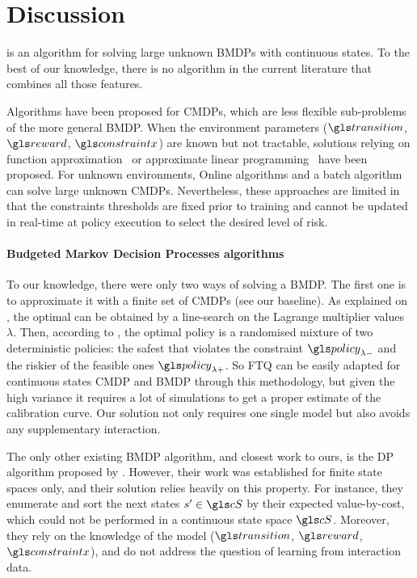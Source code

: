 \section*{Discussion}

 is an algorithm for solving large unknown \glspl{BMDP} with continuous states. To the best of our knowledge, there is no algorithm in the current literature that combines all those features.

Algorithms have been proposed for \glspl{CMDP}, which are less flexible sub-problems of the more general \gls{BMDP}. When the environment parameters ($\Ps$, $\R$, $\constraint$) are known but not tractable, solutions relying on function approximation~\citep{Undurti2011} or approximate linear programming~\citep{Poupart2015} have been proposed. For unknown environments, Online algorithms \citep{Geibel2005, Abe2010,Achiam2017,Chow2018} and a batch algorithm \citep{Thomas2015, Ghavamzadeh2016, Laroche2019,Le2019} can solve large unknown \glspl{CMDP}. Nevertheless, these approaches are limited in that the constraints thresholds are fixed prior to training and cannot be updated in real-time at policy execution to select the desired level of risk.

\paragraph{Budgeted Markov Decision Processes algorithms}
To our knowledge, there were only two ways of solving a \gls{BMDP}. The first one is to approximate it with a finite set of \glspl{CMDP} (\eg see our \FTQl baseline). As explained on , the optimal  can be obtained by a line-search on the Lagrange multiplier values $\lambda$. Then, according to \citet[Theorem 4.4]{Beutler1985}, the optimal policy is a randomised mixture of two deterministic policies: the safest  that violates the constraint $\policy_{\lambda-}$ and the riskier of the feasible ones $\policy_{\lambda+}$. So \gls{FTQ} can be easily adapted for continuous states \gls{CMDP} and \gls{BMDP} through this methodology, but given the high variance it requires a lot of simulations to get a proper estimate of the calibration curve. Our solution not only requires one single model but also avoids any supplementary interaction.

The only other existing \gls{BMDP} algorithm, and closest work to ours, is the \gls{DP} algorithm proposed by \citet{Boutilier_Lu:uai16}. However, their work was established for finite state spaces only, and their solution relies heavily on this property. For instance, they enumerate and sort the next states $s'\in\cS$ by their expected value-by-cost, which could not be performed in a continuous state space $\cS$. Moreover, they rely on the knowledge of the model ($\Ps$, $\R$, $\constraint$), and do not address the question of learning from interaction data.


